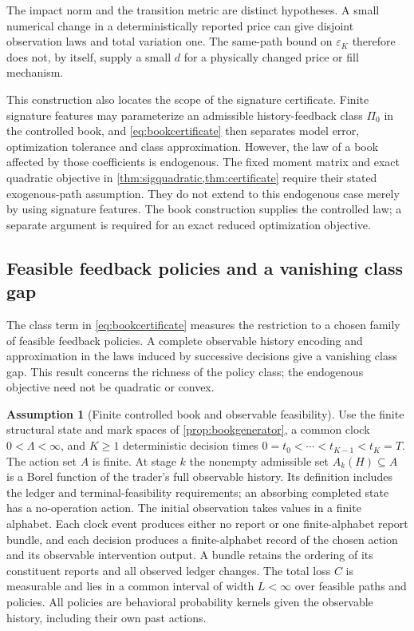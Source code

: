 \documentclass[11pt]{article}
\numberwithin{equation}{section}
\theoremstyle{definition}
\theoremstyle{remark}
\theoremstyle{definition}
\newtheorem{assumption}[theorem]{Assumption}
\begin{document}
The impact norm and the transition metric are distinct hypotheses. A small
numerical change in a deterministically reported price can give disjoint
observation laws and total variation one. The same-path bound on
$\varepsilon_K$ therefore does not, by itself, supply a small $d$ for a
physically changed price or fill mechanism.

This construction also locates the scope of the signature certificate.
Finite signature features may parameterize an admissible history-feedback
class $\Pi_0$ in the controlled book, and \eqref{eq:bookcertificate} then
separates model error, optimization tolerance and class approximation.
However, the law of a book affected by those coefficients is endogenous.
The fixed moment matrix and exact quadratic objective in
\cref{thm:sigquadratic,thm:certificate} require their stated exogenous-path
assumption. They do not extend to this endogenous case merely by using
signature features. The book construction supplies the controlled law; a
separate argument is required for an exact reduced optimization objective.

\subsection{Feasible feedback policies and a vanishing class gap}
\label{sec:classgap}

The class term in \eqref{eq:bookcertificate} measures the restriction to a
chosen family of feasible feedback policies. A complete observable history
encoding and approximation in the laws induced by successive decisions give
a vanishing class gap. This result concerns the richness of the policy class;
the endogenous objective need not be quadratic or convex.

\begin{assumption}[Finite controlled book and observable feasibility]
\label{ass:finitebook}
Use the finite structural state and mark spaces of
\cref{prop:bookgenerator}, a common clock $0<\Lambda<\infty$, and $K\ge1$
deterministic decision times $0=t_0<\cdots<t_{K-1}<t_K=T$.
The action set $A$ is finite. At stage $k$ the nonempty admissible set
$A_k(H)\subseteq A$ is a Borel function of the trader's full observable
history. Its definition includes the ledger and terminal-feasibility
requirements; an absorbing completed state has a no-operation action.
The initial observation takes values in a finite alphabet. Each clock event
produces either no report or one finite-alphabet report bundle, and each
decision produces a finite-alphabet record of the chosen action and its
observable intervention output. A bundle retains the ordering of its
constituent reports and all observed ledger changes. The total loss $C$ is
measurable and lies in a common interval of width $L<\infty$ over feasible
paths and policies. All policies are behavioral probability kernels given
the observable history, including their own past actions.
\end{assumption}
\end{document}
